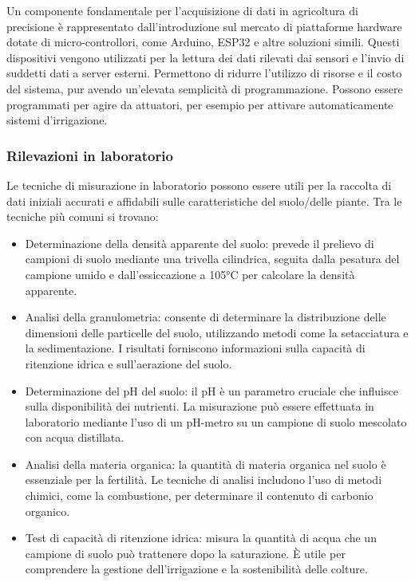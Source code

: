 \documentclass[12pt,a4paper,openright,twoside, openany]{book}
\begin{document}
Un componente fondamentale per l'acquisizione di dati in agricoltura di precisione è rappresentato dall'introduzione sul mercato di piattaforme hardware dotate di micro-controllori, come Arduino, ESP32 e altre soluzioni simili. Questi dispositivi vengono utilizzati per la lettura dei dati rilevati dai sensori e l'invio di suddetti dati a server esterni. Permettono di ridurre l'utilizzo di risorse e il costo del sistema, pur avendo un'elevata semplicità di programmazione. Possono essere programmati per agire da attuatori, per esempio per attivare automaticamente sistemi d'irrigazione\cite{iot4030012, su16010306}.

\subsubsection{Rilevazioni in laboratorio}

Le tecniche di misurazione in laboratorio possono essere utili per la raccolta di dati iniziali accurati e affidabili sulle caratteristiche del suolo/delle piante. Tra le tecniche più comuni si trovano:
\begin{itemize}[noitemsep]
    \item Determinazione della densità apparente del suolo: prevede il prelievo di campioni di suolo mediante una trivella cilindrica, seguita dalla pesatura del campione umido e dall'essiccazione a 105°C per calcolare la densità apparente\cite{BULK-DENSITY}.
    \item Analisi della granulometria: consente di determinare la distribuzione delle dimensioni delle particelle del suolo, utilizzando metodi come la setacciatura e la sedimentazione. I risultati forniscono informazioni sulla capacità di ritenzione idrica e sull'aerazione del suolo\cite{GRANUMETRIC-ANALYSIS}.
    \item Determinazione del pH del suolo: il pH è un parametro cruciale che influisce sulla disponibilità dei nutrienti. La misurazione può essere effettuata in laboratorio mediante l'uso di un pH-metro su un campione di suolo mescolato con acqua distillata\cite{PH-SOIL}.
    \item Analisi della materia organica: la quantità di materia organica nel suolo è essenziale per la fertilità. Le tecniche di analisi includono l'uso di metodi chimici, come la combustione, per determinare il contenuto di carbonio organico\cite{ORGANIC-SOIL}.
    \item Test di capacità di ritenzione idrica: misura la quantità di acqua che un campione di suolo può trattenere dopo la saturazione. È utile per comprendere la gestione dell'irrigazione e la sostenibilità delle colture\cite{WATER-RETENTION-LAB}.
\end{itemize}
\end{document}
